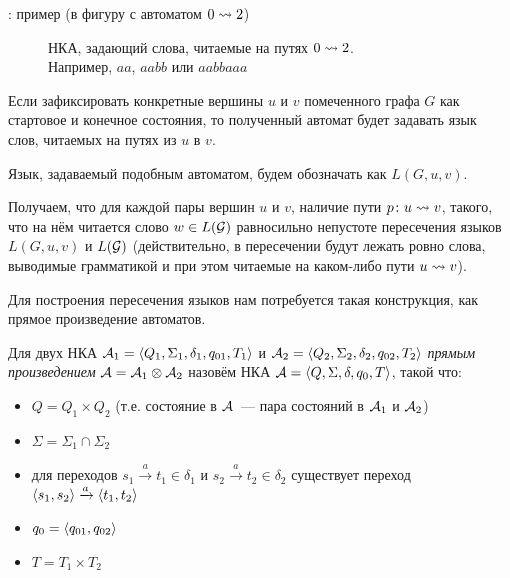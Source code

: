 \TODO: пример (в фигуру с автоматом $0 \rightsquigarrow 2$)

\begin{figure}[H]
  \caption{НКА, задающий слова, читаемые на путях $0 \rightsquigarrow 2$.\\ Например, $aa$, $aabb$ или $aabbaaa$}
\end{figure} 

\begin{proposition}
  Если зафиксировать конкретные вершины $u$ и $v$ помеченного графа $G$ как стартовое и конечное состояния, то полученный автомат будет задавать язык слов, читаемых на путях из $u$ в $v$.

\end{proposition}

Язык, задаваемый подобным автоматом, будем обозначать как $L(G, u, v)$.

Получаем, что для каждой пары вершин $u$ и $v$, наличие пути $p \colon u \rightsquigarrow v$, такого, что на нём читается слово $w \in L(\mathcal{G})$ равносильно непустоте пересечения языков $L(G, u, v)$ и $L(\mathcal{G})$ (действительно, в пересечении будут лежать ровно слова, выводимые грамматикой и при этом читаемые на каком-либо пути $u \rightsquigarrow v$).

Для построения пересечения языков нам потребуется такая конструкция, как прямое произведение автоматов.

\begin{definition}

  Для двух НКА $\mathcal{A}_1 = \langle Q_1, \Sigma_1, \delta_1, q_{01}, T_1 \rangle$ и $\mathcal{A}_2 = \langle Q_2, \Sigma_2, \delta_2, q_{02}, T_2 \rangle$ \textit{прямым произведением} $\mathcal{A} = \mathcal{A}_1 \otimes \mathcal{A}_2$ назовём НКА $\mathcal{A} = \langle Q, \Sigma, \delta, q_0, T \rangle$, такой что:
  \vspace{-\topsep}
  \begin{itemize}
    \setlength\itemsep{-0.1em}
    \item $Q = Q_1 \times Q_2$ (т.е. состояние в $\mathcal{A}$~--- пара состояний в $\mathcal{A}_1$ и $\mathcal{A}_2$)
    \item $\Sigma = \Sigma_1 \cap \Sigma_2$
    \item для переходов $s_1 \xrightarrow{a} t_1 \in \delta_1$ и $s_2 \xrightarrow{a} t_2 \in \delta_2$ существует переход $\langle s_1, s_2 \rangle \xrightarrow{a} \langle t_1, t_2 \rangle$ 
    \item $q_0 = \langle q_{01}, q_{02} \rangle$
    \item $T = T_1 \times T_2$
  \end{itemize}

\end{definition}

